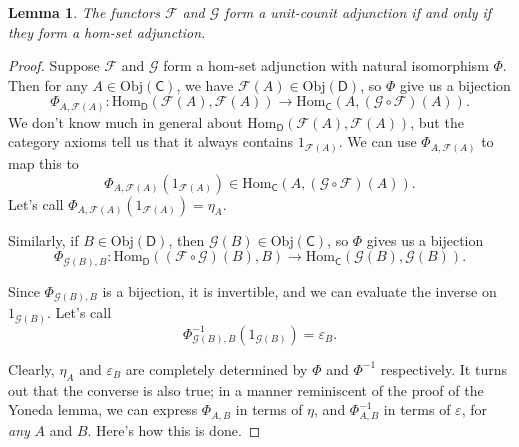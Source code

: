 \documentclass[a4paper]{report}
\newcommand{\Obj}{\mathrm{Obj}}
\newcommand{\Hom}{\mathrm{Hom}}
\theoremstyle{definition}
\theoremstyle{plain}
\newtheorem{lemma}{Lemma}[section]
\theoremstyle{remark}
\begin{document}
\begin{lemma}
  The functors $\mathcal{F}$ and $\mathcal{G}$ form a unit-counit adjunction if and only if they form a hom-set adjunction.
\end{lemma}
\begin{proof}
  Suppose $\mathcal{F}$ and $\mathcal{G}$ form a hom-set adjunction with natural isomorphism $\Phi$. Then for any $A \in \Obj(\mathsf{C})$, we have $\mathcal{F}(A) \in \Obj(\mathsf{D})$, so $\Phi$ give us a bijection
  \begin{equation*}
    \Phi_{A, \mathcal{F}(A)}\colon \Hom_{\mathsf{D}}(\mathcal{F}(A), \mathcal{F}(A)) \to \Hom_{\mathsf{C}}(A, (\mathcal{G} \circ \mathcal{F})(A)).
  \end{equation*}
  We don't know much in general about $\Hom_{\mathsf{D}}(\mathcal{F}(A), \mathcal{F}(A))$, but the category axioms tell us that it always contains $1_{\mathcal{F}(A)}$. We can use $\Phi_{A, \mathcal{F}(A)}$ to map this to
  \begin{equation*}
    \Phi_{A, \mathcal{F}(A)}(1_{\mathcal{F}(A)}) \in \Hom_{\mathsf{C}}(A, (\mathcal{G} \circ \mathcal{F})(A)).
  \end{equation*}
  Let's call $\Phi_{A, \mathcal{F}(A)}(1_{\mathcal{F}(A)}) = \eta_{A}$. 

  Similarly, if $B \in \Obj(\mathsf{D})$, then $\mathcal{G}(B) \in \Obj(\mathsf{C})$, so $\Phi$ gives us a bijection
  \begin{equation*}
    \Phi_{\mathcal{G}(B), B}\colon \Hom_{\mathsf{D}}((\mathcal{F} \circ \mathcal{G})(B), B) \to \Hom_{\mathsf{C}}(\mathcal{G}(B), \mathcal{G}(B)).
  \end{equation*}

  Since $\Phi_{\mathcal{G}(B), B}$ is a bijection, it is invertible, and we can evaluate the inverse on $1_{\mathcal{G}(B)}$. Let's call
  \begin{equation*}
    \Phi^{-1}_{\mathcal{G}(B), B}(1_{\mathcal{G}(B)}) = \varepsilon_{B}.
  \end{equation*}

  Clearly, $\eta_{A}$ and $\varepsilon_{B}$ are completely determined by $\Phi$ and $\Phi^{-1}$ respectively. It turns out that the converse is also true; in a manner reminiscent of the proof of the Yoneda lemma, we can express $\Phi_{A, B}$ in terms of $\eta$, and $\Phi^{-1}_{A, B}$ in terms of $\varepsilon$, for \emph{any} $A$ and $B$. Here's how this is done.


\end{proof}
\end{document}
